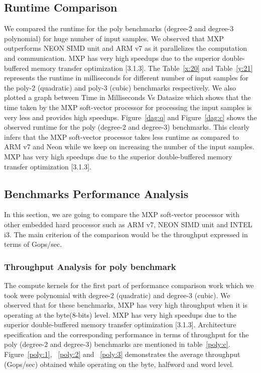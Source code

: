 \subsection{Runtime Comparison}
We compared the runtime for the poly benchmarks (degree-2 and degree-3 polynomial) for huge number of input samples. We observed that MXP outperforms NEON SIMD unit and ARM v7 as it parallelizes the computation and communication. MXP has very high speedups due to the superior double-buffered memory transfer optimization [3.1.3]. The Table~\ref{x:20} and Table~\ref{y:21} represents the runtime in milliseconds for different number of input samples for the poly-2 (quadratic) and poly-3 (cubic) benchmarks respectively. We also plotted a graph between Time in Milliseconds Vs Datasize which shows that the time taken by the MXP soft-vector processor for processing the input samples is very less and provides high speedups. Figure~\ref{dag:q} and Figure~\ref{dag:c} shows the observed runtime for the poly (degree-2 and degree-3) benchmarks. This clearly infers that the MXP soft-vector processor takes less runtime as compared to ARM v7 and Neon while we keep on increasing the number of the input samples. MXP has very high speedups due to the superior double-buffered memory transfer optimization [3.1.3].









\subsection{Benchmarks Performance Analysis}
In this section, we are going to compare the MXP soft-vector processor with other embedded hard processor such as ARM v7, NEON SIMD unit and INTEL i3. The main criterion of the comparison would be the throughput expressed in terms of Gops/sec.

\subsubsection{Throughput Analysis for poly benchmark}

The compute kernels for the first part of performance comparison work which we took were polynomial with degree-2 (quadratic) and degree-3 (cubic).
We observed that for these benchmarks, MXP has very high throughput when it is operating at the byte(8-bits) level. MXP has very high speedups due to the superior double-buffered memory transfer optimization [3.1.3]. Architecture specification and the corresponding performance in terms of throughput for the poly (degree-2 and degree-3) benchmarks are mentioned in table~\ref{poly:c}.  Figure~\ref{poly:1}, ~\ref{poly:2} and ~\ref{poly:3} demonstrates the average throughput (Gops/sec) obtained while operating on the byte, halfword and word level.

